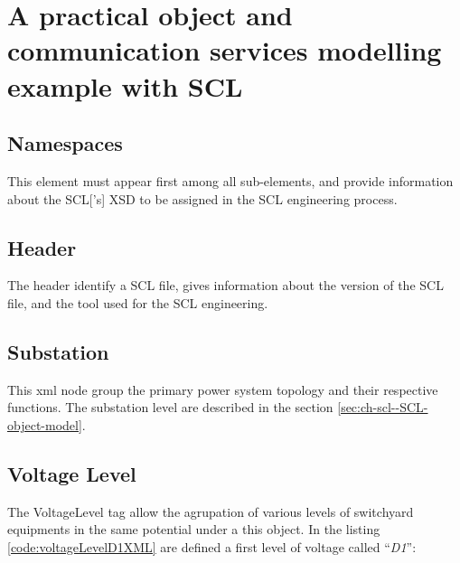 \section{A practical object and 
communication services modelling example with SCL}


\subsection{Namespaces}
	This element must appear first among all sub-elements, 
	and provide information about the \gls{SCL}['s] \gls{XSD}  
	to be assigned in the SCL engineering process.  
	
	
	




\subsection{Header}
	The header identify a SCL file, gives information about 
	the version of the SCL file, and the tool used for the 
	SCL engineering.
	




\subsection{Substation}
	This xml node group the primary power system topology
	and their respective functions.
	The substation level are described in the section
	\ref{sec:ch-scl--SCL-object-model}.
	
	




\subsection{Voltage Level}
	The VoltageLevel tag allow the agrupation 
	of various levels of switchyard equipments in the same 
	potential under a this object.
	In the listing \ref{code:voltageLevelD1XML} 
	are defined a first level of voltage called ``\emph{D1}'':
	
	
	
